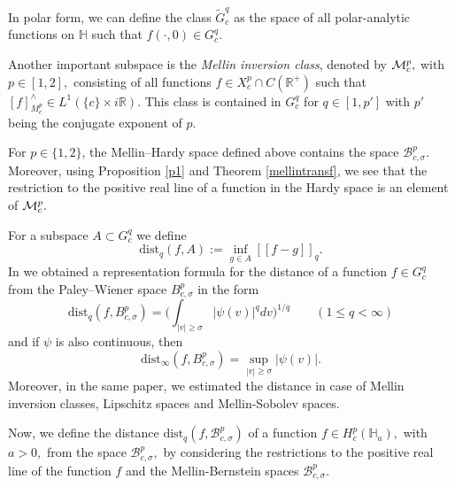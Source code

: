 \documentclass[amsmath,english,a4paper,graphicx,12pt]{article}
\begin{document}
In polar form, we can define the class $\widetilde{G}^q_c$ as the space of all polar-analytic functions on $\mathbb{H}$ such that $f(\cdot, 0) \in G^q_c.$

Another important subspace is the {\it Mellin inversion class}, denoted by ${\cal M}^p_c,$
with $p \in [1,2],$ consisting of all functions $f \in X^p_c \cap C(\mathbb{R}^+)$ such that $[f]^\wedge_{M^p_c} \in L^1(\{c\} \times i\mathbb{R}).$ 
This class is contained in $G^q_c$ for $q \in [1, p']$ with $p'$ being the conjugate exponent of $p.$

For $p \in \{1,2\}$, the Mellin--Hardy space defined above contains the space $\mathscr{B}^p_{c,\sigma}.$ Moreover, using Proposition \ref{p1} and 
Theorem \ref{mellintransf}, we see that the restriction to the positive real line of a function in the Hardy space is an element of ${\cal M}^p_c.$

For a subspace $A \subset G^q_c$ we define
$$\mbox{dist}_q(f, A) := \inf_{g \in A}[\!\![f-g]\!\!]_q.$$
In \cite{BBMS2} we obtained a representation formula for the distance of a function $f \in G^q_c$ from the Paley--Wiener space 
$B^p_{c,\sigma}$  in the form
$$\mbox{dist}_q(f , B^p_{c,\sigma}) = \bigg(\int_{|v| \geq \sigma} |\psi(v)|^q dv\bigg)^{1/q} \qquad (1 \leq q < \infty)$$
and if $\psi$ is also continuous, then
$$\mbox{dist}_\infty(f, B^p_{c,\sigma}) = \sup_{|v|\geq \sigma}|\psi(v)|.$$
Moreover, in the same paper, we estimated the distance in case of Mellin inversion classes, Lipschitz spaces and Mellin-Sobolev spaces.

Now, we define the distance $\mbox{dist}_q(f, \mathscr{B}^p_{c, \sigma})$ of a function $f \in H^p_c(\mathbb{H}_a),$  with $a >0,$ from the space $\mathscr{B}^p_{c, \sigma},$ by considering the restrictions to the positive real line of the function $f$ and the Mellin-Bernstein spaces $\mathscr{B}^p_{c, \sigma}.$
\end{document}
